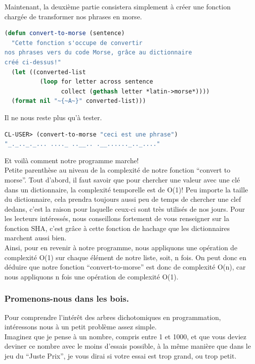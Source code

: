 \documentclass[a4paper, 12pt]{article}
\numberwithin{equation}{subsection}
\begin{document}
Maintenant, la deuxième partie consistera simplement à créer une fonction chargée de transformer nos phrases en morse. \\
\begin{lstlisting}[language=Lisp]
(defun convert-to-morse (sentence)
  "Cette fonction s'occupe de convertir
nos phrases vers du code Morse, grâce au dictionnaire
créé ci-dessus!"
  (let ((converted-list
          (loop for letter across sentence
                collect (gethash letter *latin->morse*))))
  (format nil "~{~A~}" converted-list)))
\end{lstlisting}
Il ne nous reste plus qu'à tester.
\begin{lstlisting}[language=Lisp]
CL-USER> (convert-to-morse "ceci est une phrase")
"_._.._._... ...._ ..__.. .__......_.._...."
\end{lstlisting}
Et voilà comment notre programme marche! \\

Petite parenthèse au niveau de la complexité de notre fonction ``convert to morse''. Tout d'abord, il faut savoir que pour chercher une valeur avec une clé dans un dictionnaire, la complexité temporelle est de O(1)! Peu importe la taille du dictionnaire, cela prendra toujours aussi peu de temps de chercher une clef dedans, c'est la raison pour laquelle ceux-ci sont très utilisés de nos jours.
Pour les lecteurs intéressés, nous conseillons fortement de vous renseigner sur la fonction SHA, c'est grâce à cette fonction de hachage que les dictionnaires marchent aussi bien. \\

Ainsi, pour en revenir à notre programme, nous appliquons une opération de complexité O(1) sur chaque élément de notre liste, soit, n fois. On peut donc en déduire que notre fonction ``convert-to-morse'' est donc de complexité O(n), car nous appliquons n fois une opération de complexité O(1). \\[0.2cm]
\subsubsection{Promenons-nous dans les bois.}
Pour comprendre l'intérêt des arbres dichotomiques en programmation, intéressons nous à un petit problème assez simple. \\

Imaginez que je pense à un nombre, compris entre 1 et 1000, et que vous deviez deviner ce nombre avec le moins d'essais possible, à la même manière que dans le jeu du ``Juste Prix'', je vous dirai si votre essai est trop grand, ou trop petit. \\
\end{document}
